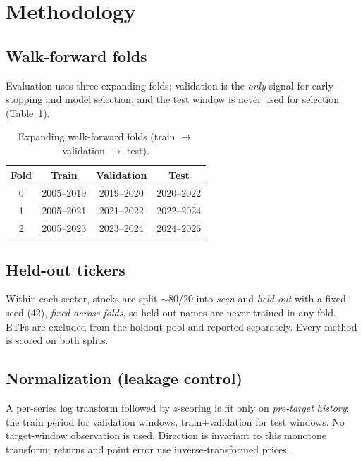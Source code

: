 \documentclass[11pt]{article}
\begin{document}
\section{Methodology}

\subsection{Walk-forward folds}
Evaluation uses three expanding folds; validation is the \emph{only} signal for early
stopping and model selection, and the test window is never used for selection
(Table~\ref{tab:folds}).

\begin{table}[H]
\centering
\caption{Expanding walk-forward folds (train $\rightarrow$ validation $\rightarrow$ test).}
\label{tab:folds}
\begin{tabular}{cccc}
\toprule
Fold & Train & Validation & Test \\
\midrule
0 & 2005--2019 & 2019--2020 & 2020--2022 \\
1 & 2005--2021 & 2021--2022 & 2022--2024 \\
2 & 2005--2023 & 2023--2024 & 2024--2026 \\
\bottomrule
\end{tabular}
\end{table}

\subsection{Held-out tickers}
Within each sector, stocks are split $\sim$80/20 into \emph{seen} and \emph{held-out}
with a fixed seed (42), \emph{fixed across folds}, so held-out names are never trained
in any fold. ETFs are excluded from the holdout pool and reported separately. Every
method is scored on both splits.

\subsection{Normalization (leakage control)}
A per-series log transform followed by $z$-scoring is fit only on \emph{pre-target
history}: the train period for validation windows, train$+$validation for test
windows. No target-window observation is used. Direction is invariant to this monotone
transform; returns and point error use inverse-transformed prices.
\end{document}
